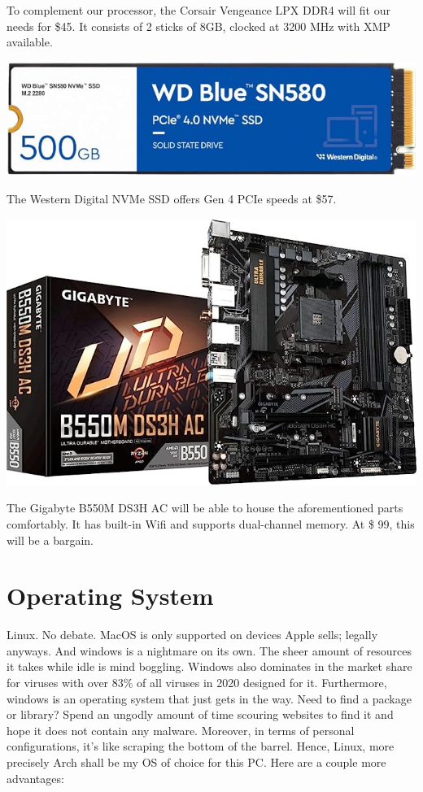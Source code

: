 \documentclass[12pt, a4paper]{article}
\begin{document}
To complement our processor, the Corsair Vengeance LPX DDR4 will fit our
needs for \$45. It consists of 2 sticks of 8GB, clocked at 3200 MHz
with XMP available.

\vspace{4pt}
\begin{center}
  \includegraphics[scale=0.2]{ssssssssssssd.jpg}
\end{center}

The Western Digital NVMe SSD offers Gen 4 PCIe speeds at \$57.

\vspace{4pt}
\begin{center}
  \includegraphics[scale=0.32]{mothaaaaaaaaaaa.jpg}
\end{center}

The Gigabyte B550M DS3H AC will be able to house the aforementioned
parts comfortably. It has built-in Wifi and supports dual-channel 
memory. At \$ 99, this will be a bargain.



\section{Operating System}
Linux. No debate. MacOS is only supported on devices Apple sells; legally
anyways. And windows is a nightmare on its own. The sheer amount of resources
it takes while idle is mind boggling. Windows also dominates in the market
share for viruses with over 83\% of all viruses in 2020 designed for it.
Furthermore, windows is an operating system that just gets in the way.
Need to find a package or library? Spend an ungodly amount of time
scouring websites to find it and hope it does not contain any malware.
Moreover, in terms of personal configurations, it's like scraping the 
bottom of the barrel. Hence, Linux, more precisely Arch shall be my OS of
choice for this PC. Here are a couple more advantages:
\end{document}
